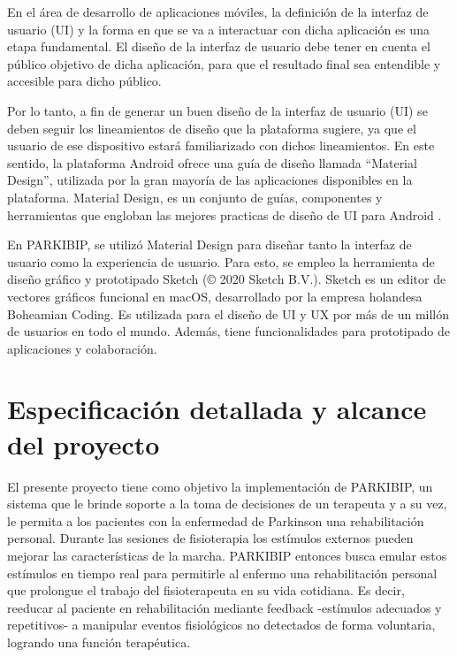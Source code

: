 En el área de desarrollo de aplicaciones móviles, la definición de la interfaz de usuario (UI) y la forma en que se va a interactuar con dicha aplicación es una etapa fundamental. El diseño de la interfaz de usuario debe tener en cuenta el público objetivo de dicha aplicación, para que el resultado final sea entendible y accesible para dicho público. 

Por lo tanto, a fin de generar un buen diseño de la interfaz de usuario (UI) se deben seguir los lineamientos de diseño que la plataforma sugiere, ya que el usuario de ese dispositivo estará familiarizado con dichos lineamientos. En este sentido, la plataforma Android ofrece una guía de diseño llamada ``Material Design'', utilizada por la gran mayoría de las aplicaciones disponibles en la plataforma. Material Design, es un conjunto de guías, componentes y herramientas que engloban las mejores practicas de diseño de UI para Android \cite{MaterialDesign}. 
 
En PARKIBIP, se utilizó Material Design para diseñar tanto la interfaz de usuario como la experiencia de usuario. Para esto, se empleo la herramienta de diseño gráfico y prototipado Sketch (© 2020 Sketch B.V.). Sketch es un editor de vectores gráficos funcional en macOS, desarrollado por la empresa holandesa Boheamian Coding. Es utilizada para el diseño de UI y UX por más de un millón de usuarios en todo el mundo. Además, tiene funcionalidades para prototipado de aplicaciones y colaboración. 

\section{Especificación detallada y alcance del proyecto }
\label{chap:project-scope}

El presente proyecto tiene como objetivo la implementación de PARKIBIP, un sistema que le brinde soporte a la toma de decisiones de un terapeuta y a su vez, le permita a los pacientes con la enfermedad de Parkinson una rehabilitación personal. Durante las sesiones de fisioterapia los estímulos externos pueden mejorar las características de la marcha. PARKIBIP entonces busca emular estos estímulos en tiempo real para permitirle al enfermo una rehabilitación personal que prolongue el trabajo del fisioterapeuta en su vida cotidiana. Es decir, reeducar al paciente en rehabilitación mediante feedback -estímulos adecuados y repetitivos- a manipular eventos fisiológicos no detectados de forma voluntaria, logrando una función terapéutica.

